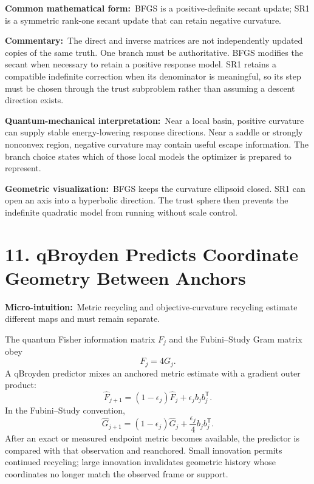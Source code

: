 \documentclass[10pt,twocolumn]{article}
\newcommand{\micro}[1]{\par\noindent\textbf{Micro-intuition:}\ #1\par}
\newcommand{\form}[1]{\par\noindent\textbf{Common mathematical form:}\ #1\par}
\newcommand{\commentary}[1]{\par\noindent\textbf{Commentary:}\ #1\par}
\newcommand{\phys}[1]{\par\noindent\textbf{Quantum-mechanical interpretation:}\ #1\par}
\newcommand{\geom}[1]{\par\noindent\textbf{Geometric visualization:}\ \textcolor{teal!70!black}{#1}\par}
\newcommand{\conceptbreak}{\par\medskip\noindent{\color{black!30}\rule{\columnwidth}{0.35pt}}\par\medskip}
\begin{document}
\form{BFGS is a positive-definite secant update; SR1 is a symmetric rank-one
secant update that can retain negative curvature.}

\commentary{The direct and inverse matrices are not independently updated
copies of the same truth. One branch must be authoritative. BFGS modifies the
secant when necessary to retain a positive response model. SR1 retains a
compatible indefinite correction when its denominator is meaningful, so its
step must be chosen through the trust subproblem rather than assuming a descent
direction exists.}

\phys{Near a local basin, positive curvature can supply stable energy-lowering
response directions. Near a saddle or strongly nonconvex region, negative
curvature may contain useful escape information. The branch choice states which
of those local models the optimizer is prepared to represent.}

\geom{BFGS keeps the curvature ellipsoid closed. SR1 can open an axis into a
hyperbolic direction. The trust sphere then prevents the indefinite quadratic
model from running without scale control.}

\conceptbreak

\section*{11. qBroyden Predicts Coordinate Geometry Between Anchors}

\micro{Metric recycling and objective-curvature recycling estimate different
maps and must remain separate.}

The quantum Fisher information matrix \(F_j\) and the Fubini--Study Gram matrix
obey
\begin{equation}
F_j=4G_j.
\label{eq:qfim-fs}
\end{equation}
A qBroyden predictor mixes an anchored metric estimate with a gradient outer
product:
\begin{equation}
\widehat F_{j+1}
=(1-\epsilon_j)\widehat F_j
+\epsilon_j b_jb_j^{\mathsf T}.
\label{eq:qbroyd-predictor}
\end{equation}
In the Fubini--Study convention,
\begin{equation}
\widehat G_{j+1}
=(1-\epsilon_j)\widehat G_j
+\frac{\epsilon_j}{4}b_jb_j^{\mathsf T}.
\label{eq:qbroyd-fs}
\end{equation}
After an exact or measured endpoint metric becomes available, the predictor is
compared with that observation and reanchored. Small innovation permits
continued recycling; large innovation invalidates geometric history whose
coordinates no longer match the observed frame or support.
\end{document}
